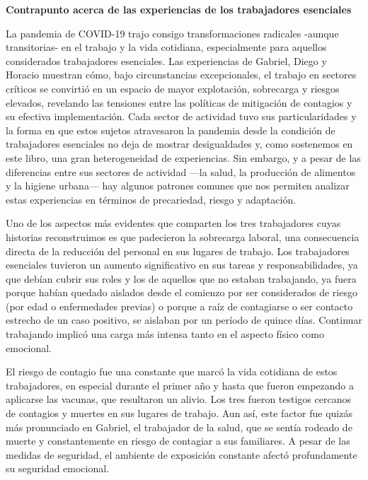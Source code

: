 \textbf{Contrapunto acerca de las experiencias de los trabajadores esenciales}

La pandemia de COVID-19 trajo consigo transformaciones radicales -aunque transitorias- en el trabajo y la vida cotidiana, especialmente para aquellos considerados trabajadores esenciales. Las experiencias de Gabriel, Diego y Horacio muestran cómo, bajo circunstancias excepcionales, el trabajo en sectores críticos se convirtió en un espacio de mayor explotación, sobrecarga y riesgos elevados, revelando las tensiones entre las políticas de mitigación de contagios y su efectiva implementación. Cada sector de actividad tuvo sus particularidades y la forma en que estos sujetos atravesaron la pandemia desde la condición de trabajadores esenciales no deja de mostrar desigualdades y, como sostenemos en este libro, una gran heterogeneidad de experiencias. Sin embargo, y a pesar de las diferencias entre sus sectores de actividad ---la salud, la producción de alimentos y la higiene urbana--- hay algunos patrones comunes que nos permiten analizar estas experiencias en términos de precariedad, riesgo y adaptación.

Uno de los aspectos más evidentes que comparten los tres trabajadores cuyas historias reconstruimos es que padecieron la sobrecarga laboral, una consecuencia directa de la reducción del personal en sus lugares de trabajo. Los trabajadores esenciales tuvieron un aumento significativo en sus tareas y responsabilidades, ya que debían cubrir sus roles y los de aquellos que no estaban trabajando, ya fuera porque habían quedado aislados desde el comienzo por ser considerados de riesgo (por edad o enfermedades previas) o porque a raíz de contagiarse o ser contacto estrecho de un caso positivo, se aislaban por un período de quince días. Continuar trabajando implicó una carga más intensa tanto en el aspecto físico como emocional.

El riesgo de contagio fue una constante que marcó la vida cotidiana de estos trabajadores, en especial durante el primer año y hasta que fueron empezando a aplicarse las vacunas, que resultaron un alivio. Los tres fueron testigos cercanos de contagios y muertes en sus lugares de trabajo. Aun así, este factor fue quizás más pronunciado en Gabriel, el trabajador de la salud, que se sentía rodeado de muerte y constantemente en riesgo de contagiar a sus familiares. A pesar de las medidas de seguridad, el ambiente de exposición constante afectó profundamente su seguridad emocional.

